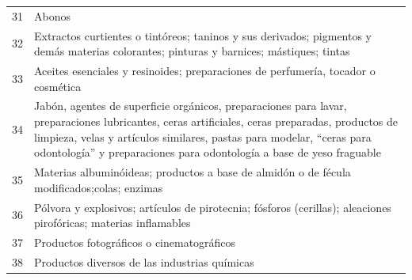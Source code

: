 \documentclass[a4paper,openright,12pt]{book}
\begin{document}
\begin{table}[]
{\begin{tabular}{@{}ll@{}}
31  & Abonos                                                                                                                                                                                                                                                                                         \\
32  & Extractos curtientes o tintóreos; taninos y sus derivados; pigmentos y demás materias colorantes; pinturas y barnices; mástiques; tintas                                                                                                                                                       \\
33  & Aceites esenciales y resinoides; preparaciones de perfumería, tocador o cosmética                                                                                                                                                                                                              \\
34  & Jabón, agentes de superficie orgánicos, preparaciones para lavar, preparaciones lubricantes, ceras artificiales, ceras preparadas, productos de limpieza, velas y artículos similares, pastas para modelar, “ceras para odontología” y preparaciones para odontología a base de yeso fraguable \\
35  & Materias albuminóideas; productos a base de almidón o de fécula modificados;colas; enzimas                                                                                                                                                                                                     \\
36  & Pólvora y explosivos; artículos de pirotecnia; fósforos (cerillas); aleaciones pirofóricas; materias inflamables                                                                                                                                                                               \\
37  & Productos fotográficos o cinematográficos                                                                                                                                                                                                                                                      \\
38  & Productos diversos de las industrias químicas                                                                                                                                                                                                                                                  \\

\end{tabular}}
\end{table}
\end{document}
